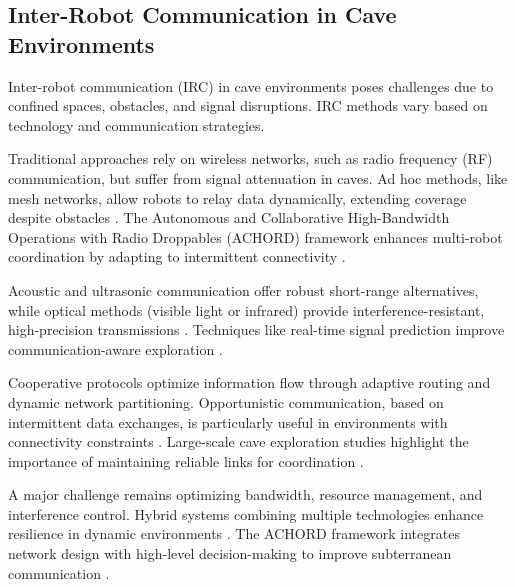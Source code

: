 \documentclass[../main.tex]{subfiles}
\begin{document}
\subsection{Inter-Robot Communication in Cave Environments}

Inter-robot communication (IRC) in cave environments poses challenges due to confined spaces, obstacles, and signal disruptions. IRC methods vary based on technology and communication strategies.

\vspace{1em}

Traditional approaches rely on wireless networks, such as radio frequency (RF) communication, but suffer from signal attenuation in caves. Ad hoc methods, like mesh networks, allow robots to relay data dynamically, extending coverage despite obstacles \cite{silva_2022}. The Autonomous and Collaborative High-Bandwidth Operations with Radio Droppables (ACHORD) framework enhances multi-robot coordination by adapting to intermittent connectivity \cite{silva_2022}.

\vspace{1em}

Acoustic and ultrasonic communication offer robust short-range alternatives, while optical methods (visible light or infrared) provide interference-resistant, high-precision transmissions \cite{klaesson_2020}. Techniques like real-time signal prediction improve communication-aware exploration \cite{clark_2022}.

\vspace{1em}

Cooperative protocols optimize information flow through adaptive routing and dynamic network partitioning. Opportunistic communication, based on intermittent data exchanges, is particularly useful in environments with connectivity constraints \cite{banfi_2018}. Large-scale cave exploration studies highlight the importance of maintaining reliable links for coordination \cite{petracek_2021}.

\vspace{1em}

A major challenge remains optimizing bandwidth, resource management, and interference control. Hybrid systems combining multiple technologies enhance resilience in dynamic environments \cite{klaesson_2020}. The ACHORD framework integrates network design with high-level decision-making to improve subterranean communication \cite{silva_2022}.
\end{document}
